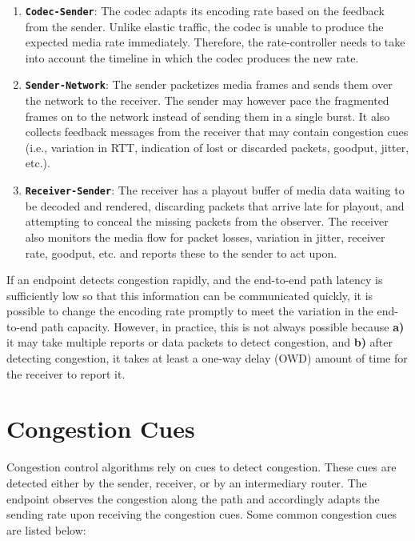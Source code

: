 \begin{enumerate}
\setlength{\itemsep}{0pt}

\item \textbf{\texttt{Codec-Sender}}: The codec adapts its encoding rate based
on the feedback from the sender. Unlike elastic traffic, the codec is unable
to produce the expected media rate immediately. Therefore, the rate-controller
needs to take into account the timeline in which the codec produces the new
rate.

\item \textbf{\texttt{Sender-Network}}: The sender packetizes media frames and
sends them over the network to the receiver. The sender may however pace the
fragmented frames on to the network instead of sending them in a single
burst. It also collects feedback messages from the receiver that may contain
congestion cues (i.e., variation in RTT, indication of lost or discarded
packets, goodput, jitter, etc.).

\item \textbf{\texttt{Receiver-Sender}}: The receiver has a playout buffer of
media data waiting to be decoded and rendered, discarding packets that arrive
late for playout, and attempting to conceal the missing packets from the
observer. The receiver also monitors the media flow for packet losses,
variation in jitter, receiver rate, goodput, etc. and reports these to the
sender to act upon.

\end{enumerate}

If an endpoint detects congestion rapidly, and the end-to-end path latency is
sufficiently low so that this information can be communicated quickly, it is
possible to change the encoding rate promptly to meet the variation in the 
end-to-end path capacity. However, in practice, this is not always possible because
\textbf{a)} it may take multiple reports or data packets to detect congestion, and
\textbf{b)} after detecting congestion, it takes at least a one-way delay (OWD)
amount of time for the receiver to report it.


\section{Congestion Cues}
\label{fw.cues}

Congestion control algorithms rely on cues to detect congestion. These cues
are detected either by the sender, receiver, or by an intermediary router. The
endpoint observes the congestion along the path and accordingly adapts the
sending rate upon receiving the congestion cues. 
Some common congestion cues are listed below:

